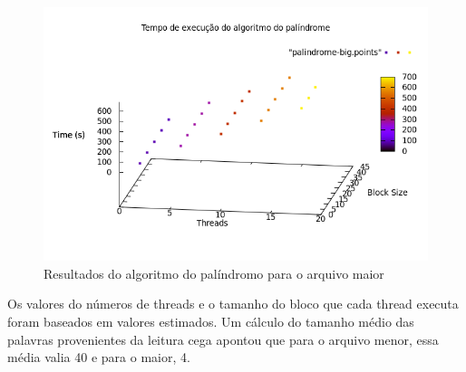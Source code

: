 \documentclass[a4paper]{article}
\begin{document}
\begin{figure}
	\includegraphics[scale=0.5]{graph-palindrome-big}
	\caption{Resultados do algoritmo do palíndromo para o arquivo maior}
	\label{graph-palindrome-big}
\end{figure}
Os valores do números de threads e o tamanho do bloco que cada thread executa foram baseados em valores estimados. Um cálculo do tamanho médio das palavras provenientes da leitura cega apontou que para o arquivo menor, essa média valia 40 e para o maior, 4.
\end{document}
